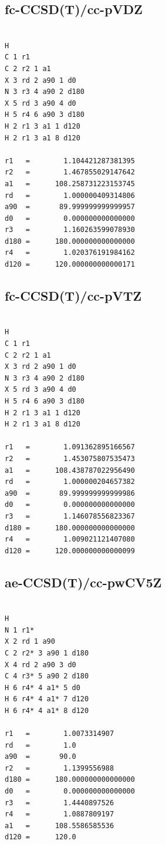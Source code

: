 \subsection{fc-CCSD(T)/cc-pVDZ}
\begin{verbatim}

H
C 1 r1
C 2 r2 1 a1
X 3 rd 2 a90 1 d0
N 3 r3 4 a90 2 d180
X 5 rd 3 a90 4 d0
H 5 r4 6 a90 3 d180
H 2 r1 3 a1 1 d120
H 2 r1 3 a1 8 d120

r1   =        1.104421287381395
r2   =        1.467855029147642
a1   =      108.258731223153745
rd   =        1.000000409314806
a90  =       89.999999999999957
d0   =        0.000000000000000
r3   =        1.160263599078930
d180 =      180.000000000000000
r4   =        1.020376191984162
d120 =      120.000000000000171

\end{verbatim}

\subsection{fc-CCSD(T)/cc-pVTZ}
\begin{verbatim}

H
C 1 r1
C 2 r2 1 a1
X 3 rd 2 a90 1 d0
N 3 r3 4 a90 2 d180
X 5 rd 3 a90 4 d0
H 5 r4 6 a90 3 d180
H 2 r1 3 a1 1 d120
H 2 r1 3 a1 8 d120

r1   =        1.091362895166567
r2   =        1.453075807535473
a1   =      108.438787022956490
rd   =        1.000000204657382
a90  =       89.999999999999986
d0   =        0.000000000000000
r3   =        1.146078556823367
d180 =      180.000000000000000
r4   =        1.009021121407080
d120 =      120.000000000000099

\end{verbatim}

\subsection{ae-CCSD(T)/cc-pwCV5Z}
\begin{verbatim}

H
N 1 r1*
X 2 rd 1 a90
C 2 r2* 3 a90 1 d180
X 4 rd 2 a90 3 d0
C 4 r3* 5 a90 2 d180
H 6 r4* 4 a1* 5 d0
H 6 r4* 4 a1* 7 d120
H 6 r4* 4 a1* 8 d120

r1   =        1.0073314907
rd   =        1.0
a90  =       90.0
r2   =        1.1399556988
d180 =      180.000000000000000
d0   =        0.000000000000000
r3   =        1.4440897526
r4   =        1.0887809197
a1   =      108.5586585536
d120 =      120.0

\end{verbatim}

